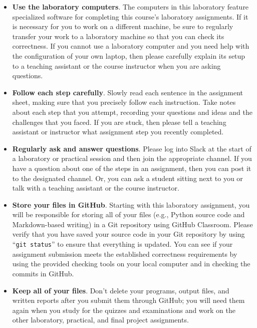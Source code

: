 \documentclass[11pt]{article}
\newcommand{\command}[1]{``\lstinline{#1}''}
\begin{document}
\begin{itemize}
  \setlength{\itemsep}{0pt}

\item {\bf Use the laboratory computers}. The computers in this laboratory feature specialized software for completing
  this course's laboratory  assignments. If it is necessary for you to work on a different machine, be sure
  to regularly transfer your work to a laboratory machine so that you can check its correctness. If you cannot use a
  laboratory computer and you need help with the configuration of your own laptop, then please carefully explain its
  setup to a teaching assistant or the course instructor when you are asking questions.

\item {\bf Follow each step carefully}. Slowly read each sentence in the assignment sheet, making sure that you
  precisely follow each instruction. Take notes about each step that you attempt, recording your questions and ideas and
  the challenges that you faced. If you are stuck, then please tell a teaching assistant or instructor what assignment
  step you recently completed.

\item {\bf Regularly ask and answer questions}. Please log into Slack at the start of a laboratory or practical session
  and then join the appropriate channel. If you have a question about one of the steps in an assignment, then you can
  post it to the designated channel. Or, you can ask a student sitting next to you or talk with a teaching assistant or
  the course instructor.

\item {\bf Store your files in GitHub}. Starting with this laboratory assignment, you will be responsible for storing
  all of your files (e.g., Python source code and Markdown-based writing) in a Git repository using GitHub Classroom.
  Please verify that you have saved your source code in your Git repository by using \command{git status} to ensure that
  everything is updated. You can see if your assignment submission meets the established correctness requirements by
  using the provided checking tools on your local computer and in checking the commits in GitHub.

\item {\bf Keep all of your files}. Don't delete your programs, output files, and written reports after you submit them
  through GitHub; you will need them again when you study for the quizzes and examinations and work on the other
  laboratory, practical, and final project assignments.


\end{itemize}
\end{document}
